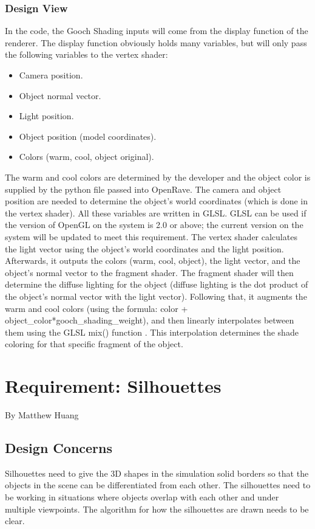 \documentclass[10pt,journal,compsoc,draftclsnofoot]{IEEEtran}
\begin{document}
\begin{flushleft}
\subsubsection{Design View}
In the code, the Gooch Shading inputs will come from the display function of the renderer.
The display function obviously holds many variables, but will only pass the following variables to the vertex shader:
\begin{itemize}
\item Camera position.
\item Object normal vector.
\item Light position.
\item Object position (model coordinates).
\item Colors (warm, cool, object original).
\end{itemize}

The warm and cool colors are determined by the developer and the object color is supplied by the python file passed into OpenRave.
The camera and object position are needed to determine the object's world coordinates (which is done in the vertex shader).
All these variables are written in GLSL.
GLSL can be used if the version of OpenGL on the system is 2.0 or above; the current version on the system will be updated to meet this requirement.
The vertex shader calculates the light vector using the object's world coordinates and the light position. 
Afterwards, it outputs the colors (warm, cool, object), the light vector, and the object's normal vector to the fragment shader.
The fragment shader will then determine the diffuse lighting for the object (diffuse lighting is the dot product of the object's normal vector with the light vector).
Following that, it augments the warm and cool colors (using the formula: color + object\_color*gooch\_shading\_weight), and then linearly interpolates between them using the GLSL mix() function \cite{glslmix}.
This interpolation determines the shade coloring for that specific fragment of the object.

\newpage

\section{Requirement: Silhouettes}
\large{By Matthew Huang}

\normalsize
\subsection{Design Concerns}
Silhouettes need to give the 3D shapes in the simulation solid borders so that the objects in the scene can be differentiated from each other.
The silhouettes need to be working in situations where objects overlap with each other and under multiple viewpoints. 
The algorithm for how the silhouettes are drawn needs to be clear.


\end{flushleft}
\end{document}
